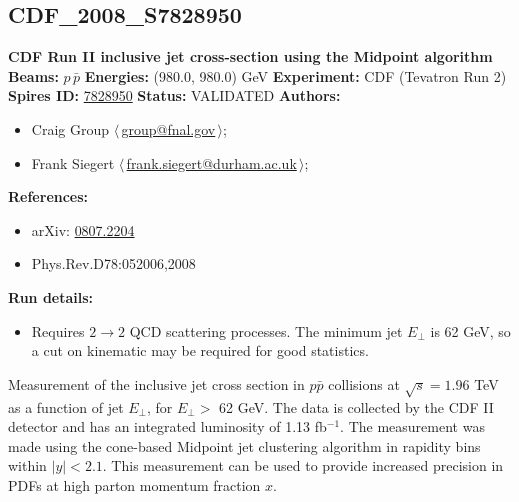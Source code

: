 \clearpage


\clearpage

\subsection[CDF\_2008\_S7828950]{CDF\_2008\_S7828950\,\cite{Aaltonen:2008eq}}
\textbf{CDF Run II inclusive jet cross-section using the Midpoint algorithm}\newline
\textbf{Beams:} $p$\,$\bar{p}$ \newline
\textbf{Energies:} (980.0, 980.0) GeV \newline
\textbf{Experiment:} CDF (Tevatron Run 2) \newline
\textbf{Spires ID:} \href{http://www.slac.stanford.edu/spires/find/hep/www?rawcmd=key+7828950}{7828950}\newline
\textbf{Status:} VALIDATED\newline
\textbf{Authors:}
\begin{itemize}
  \item Craig Group $\langle\,$\href{mailto:group@fnal.gov}{group@fnal.gov}$\,\rangle$;
  \item Frank Siegert $\langle\,$\href{mailto:frank.siegert@durham.ac.uk}{frank.siegert@durham.ac.uk}$\,\rangle$;
\end{itemize}
\textbf{References:}
\begin{itemize}
  \item arXiv: \href{http://arxiv.org/abs/0807.2204}{0807.2204}
  \item Phys.Rev.D78:052006,2008
\end{itemize}
\textbf{Run details:}
\begin{itemize}

  \item Requires $2\rightarrow{2}$ QCD scattering processes. The minimum jet $E_\perp$ is 62 GeV, so a cut on kinematic \pTmin may be required for good statistics.\end{itemize}

\noindent Measurement of the inclusive jet cross section in $p\bar{p}$ collisions at $\sqrt{s}=1.96$ TeV as a function of jet $E_\perp$, for $E_\perp >$ 62 GeV. The data is collected by the CDF II detector and has an integrated luminosity of 1.13 fb$^{-1}$. The measurement was made using the cone-based Midpoint jet clustering algorithm in rapidity bins within $|y|<2.1$. This measurement can be used to provide increased precision in PDFs at high parton momentum fraction $x$.

